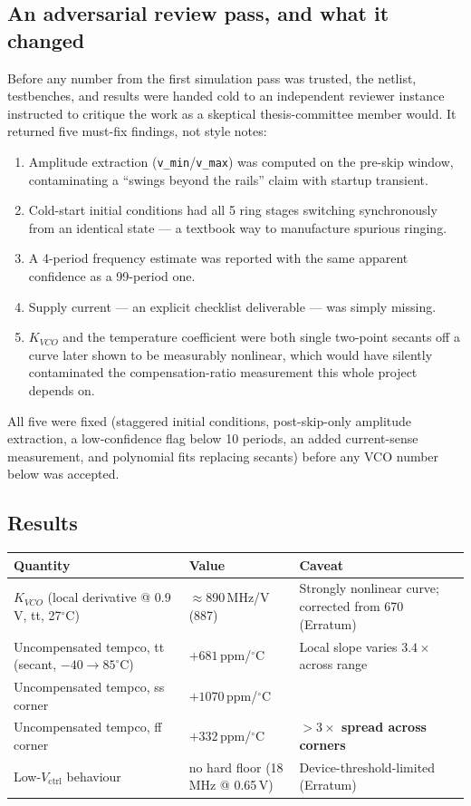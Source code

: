 \documentclass[11pt]{article}
\begin{document}
\subsection{An adversarial review pass, and what it changed}
Before any number from the first simulation pass was trusted, the netlist, testbenches, and results were handed cold to an independent reviewer instance instructed to critique the work as a skeptical thesis-committee member would. It returned five must-fix findings, not style notes:

\begin{enumerate}[leftmargin=1.5em]
  \item Amplitude extraction (\texttt{v\_min}/\texttt{v\_max}) was computed on the pre-skip window, contaminating a ``swings beyond the rails'' claim with startup transient.
  \item Cold-start initial conditions had all 5 ring stages switching synchronously from an identical state --- a textbook way to manufacture spurious ringing.
  \item A 4-period frequency estimate was reported with the same apparent confidence as a 99-period one.
  \item Supply current --- an explicit checklist deliverable --- was simply missing.
  \item $K_{VCO}$ and the temperature coefficient were both single two-point secants off a curve later shown to be measurably nonlinear, which would have silently contaminated the compensation-ratio measurement this whole project depends on.
\end{enumerate}

All five were fixed (staggered initial conditions, post-skip-only amplitude extraction, a low-confidence flag below 10 periods, an added current-sense measurement, and polynomial fits replacing secants) before any VCO number below was accepted.

\subsection{Results}

\begin{table}[h]
\centering
\small
\begin{tabular}{p{5.6cm}p{3.6cm}p{5.4cm}}
\toprule
\textbf{Quantity} & \textbf{Value} & \textbf{Caveat} \\
\midrule
$K_{VCO}$ (local derivative @ 0.9\,V, tt, 27$^\circ$C) & $\approx$890\,MHz/V (887) & Strongly nonlinear curve; corrected from 670 (Erratum) \\
Uncompensated tempco, tt (secant, $-40\to85^\circ$C) & $+681$\,ppm/$^\circ$C & Local slope varies $3.4\times$ across range \\
Uncompensated tempco, ss corner & $+1070$\,ppm/$^\circ$C & \\
Uncompensated tempco, ff corner & $+332$\,ppm/$^\circ$C & \textbf{$>3\times$ spread across corners} \\
Low-$V_{\text{ctrl}}$ behaviour & no hard floor (18\,MHz @ 0.65\,V) & Device-threshold-limited (Erratum) \\
\bottomrule
\end{tabular}
\end{table}
\end{document}
